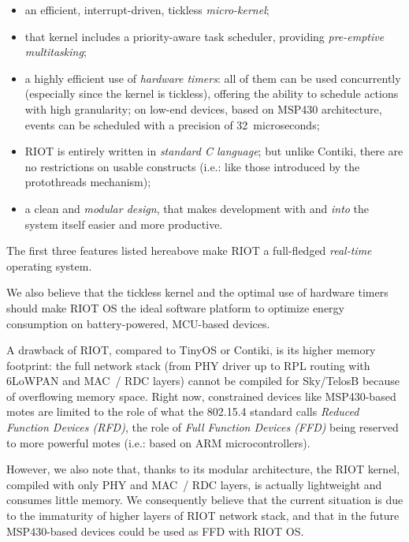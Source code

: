 \documentclass[a4paper,twoside]{article}
\begin{document}
\begin{itemize}

\item an efficient, interrupt-driven, tickless \emph{micro-kernel};

\item that kernel includes a priority-aware task scheduler, providing
      \emph{pre-emptive multitasking};

\item a highly efficient use of \emph{hardware timers}: all of them can be
      used concurrently (especially since the kernel is tickless), offering
      the ability to schedule actions with high granularity; on low-end
      devices, based on MSP430 architecture, events can be scheduled
      with a precision of 32~microseconds;

\item RIOT is entirely written in \emph{standard C language}; but unlike
      Contiki, there are no restrictions on usable constructs (i.e.: like
      those introduced by the protothreads mechanism);

\item a clean and \emph{modular design}, that makes development with and
      \emph{into} the system itself easier and more productive.

\end{itemize}

The first three features listed hereabove make RIOT a full-fledged
\emph{real-time} operating system.

We also believe that the tickless kernel and the optimal use of hardware
timers should make RIOT OS the ideal software platform to optimize energy
consumption on battery-powered, MCU-based devices.

A drawback of RIOT, compared to TinyOS or Contiki, is its higher memory
footprint: the full network stack (from PHY driver up to RPL routing with
\mbox{6LoWPAN} and MAC~/ RDC layers) cannot be compiled for Sky/TelosB
because of overflowing memory space. Right now, constrained devices like
MSP430-based motes are limited to the role of what the 802.15.4 standard
calls \emph{Reduced Function Devices (RFD)}, the role of \emph{Full
Function Devices (FFD)} being reserved to more powerful motes (i.e.:
based on ARM microcontrollers).

However, we also note that, thanks to its modular architecture, the RIOT
kernel, compiled with only PHY and MAC~/ RDC layers, is actually lightweight
and consumes little memory. We consequently believe that the current
situation is due to the immaturity of higher layers of RIOT network stack,
and that in the future MSP430-based devices could be used as FFD with RIOT OS.
\end{document}
